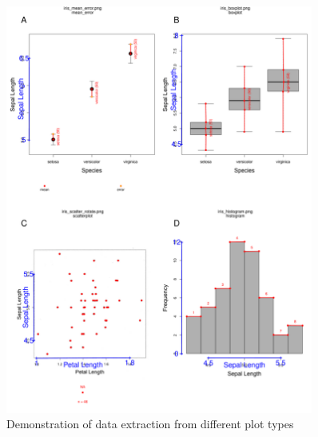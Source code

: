 \documentclass[article]{jss}
\begin{document}


\begin{figure}[!h] 
 \includegraphics[width=0.9\textwidth]{fig_all_extract.pdf} 
 \caption{Demonstration of data extraction from different plot types}
\label{fig:all_extract}
\end{figure}
\end{document}

